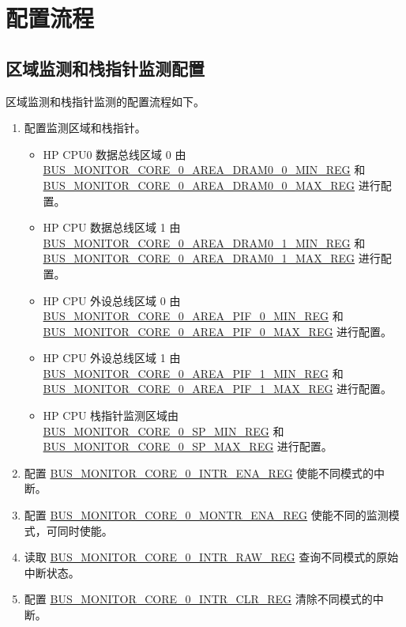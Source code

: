 \documentclass[main\_\_CN.tex]{subfiles}
\begin{document}
\section{配置流程}
\label{sec:dbgassist-prog-procedures}

\subsection{区域监测和栈指针监测配置}

区域监测和栈指针监测的配置流程如下。

\begin{enumerate}
    \item 配置监测区域和栈指针。
        \begin{itemize}
            \item HP CPU0 数据总线区域 0 由 \hyperref[regdesc:BUSMONITORCORE0AREADRAM00MINREG]{BUS\_MONITOR\_CORE\_0\_AREA\_DRAM0\_0\_MIN\_REG} 和 \hyperref[regdesc:BUSMONITORCORE0AREADRAM00MAXREG]{BUS\_MONITOR\_CORE\_0\_AREA\_DRAM0\_0\_MAX\_REG} 进行配置。
            \item HP CPU 数据总线区域 1 由 \hyperref[regdesc:BUSMONITORCORE0AREADRAM01MINREG]{BUS\_MONITOR\_CORE\_0\_AREA\_DRAM0\_1\_MIN\_REG} 和 \hyperref[regdesc:BUSMONITORCORE0AREADRAM01MAXREG]{BUS\_MONITOR\_CORE\_0\_AREA\_DRAM0\_1\_MAX\_REG} 进行配置。
            \item HP CPU 外设总线区域 0 由 \hyperref[regdesc:BUSMONITORCORE0AREAPIF0MINREG]{BUS\_MONITOR\_CORE\_0\_AREA\_PIF\_0\_MIN\_REG} 和 \hyperref[regdesc:BUSMONITORCORE0AREAPIF0MAXREG]{BUS\_MONITOR\_CORE\_0\_AREA\_PIF\_0\_MAX\_REG} 进行配置。
            \item HP CPU 外设总线区域 1 由 \hyperref[regdesc:BUSMONITORCORE0AREAPIF1MINREG]{BUS\_MONITOR\_CORE\_0\_AREA\_PIF\_1\_MIN\_REG} 和 \hyperref[regdesc:BUSMONITORCORE0AREAPIF1MAXREG]{BUS\_MONITOR\_CORE\_0\_AREA\_PIF\_1\_MAX\_REG} 进行配置。
            \item HP CPU 栈指针监测区域由 \hyperref[regdesc:BUSMONITORCORE0SPMINREG]{BUS\_MONITOR\_CORE\_0\_SP\_MIN\_REG} 和 \hyperref[regdesc:BUSMONITORCORE0SPMAXREG]{BUS\_MONITOR\_CORE\_0\_SP\_MAX\_REG} 进行配置。
        \end{itemize}
    \item 配置 \hyperref[regdesc:BUSMONITORCORE0INTRENAREG]{BUS\_MONITOR\_CORE\_0\_INTR\_ENA\_REG} 使能不同模式的中断。
    \item 配置 \hyperref[regdesc:BUSMONITORCORE0MONTRENAREG]{BUS\_MONITOR\_CORE\_0\_MONTR\_ENA\_REG} 使能不同的监测模式，可同时使能。
    \item 读取 \hyperref[regdesc:BUSMONITORCORE0INTRRAWREG]{BUS\_MONITOR\_CORE\_0\_INTR\_RAW\_REG} 查询不同模式的原始中断状态。
    \item 配置 \hyperref[regdesc:BUSMONITORCORE0INTRCLRREG]{BUS\_MONITOR\_CORE\_0\_INTR\_CLR\_REG} 清除不同模式的中断。
\end{enumerate}
\end{document}
